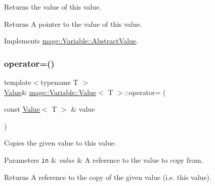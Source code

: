 Returns the value of this value.

\begin{DoxyReturn}{Returns}
A pointer to the value of this value. 
\end{DoxyReturn}


Implements \hyperlink{structmage_1_1_variable_1_1_abstract_value_aede2a77b571b80794a4254e34144f4c1}{mage\+::\+Variable\+::\+Abstract\+Value}.

\hypertarget{structmage_1_1_variable_1_1_value_a19c45282edac9ffaa0f687b7dd414392}{}\label{structmage_1_1_variable_1_1_value_a19c45282edac9ffaa0f687b7dd414392} 
\subsubsection{\texorpdfstring{operator=()}{operator=()}\hspace{0.1cm}{\footnotesize\ttfamily [1/2]}}
{\footnotesize\ttfamily template$<$typename T $>$ \\
\hyperlink{structmage_1_1_variable_1_1_value}{Value}\& \hyperlink{structmage_1_1_variable_1_1_value}{mage\+::\+Variable\+::\+Value}$<$ T $>$\+::operator= (\begin{DoxyParamCaption}\item[{const \hyperlink{structmage_1_1_variable_1_1_value}{Value}$<$ T $>$ \&}]{value }\end{DoxyParamCaption})\hspace{0.3cm}{\ttfamily [delete]}}

Copies the given value to this value.


\begin{DoxyParams}[1]{Parameters}
\mbox{\tt in}  & {\em value} & A reference to the value to copy from. \\
\hline
\end{DoxyParams}
\begin{DoxyReturn}{Returns}
A reference to the copy of the given value (i.\+e. this value). 
\end{DoxyReturn}
\hypertarget{structmage_1_1_variable_1_1_value_a2185d5eeb8f321a7e4f6d97463af4987}{}\label{structmage_1_1_variable_1_1_value_a2185d5eeb8f321a7e4f6d97463af4987} 
